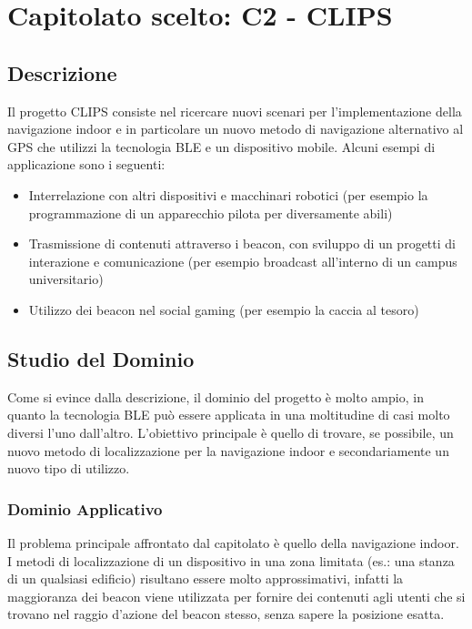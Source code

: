 \section{Capitolato scelto: C2 - CLIPS}

\subsection{Descrizione}

Il progetto CLIPS consiste nel ricercare nuovi scenari per l'implementazione della navigazione indoor e in particolare 
un nuovo metodo di navigazione alternativo al GPS che utilizzi la tecnologia BLE e un dispositivo mobile.
Alcuni esempi di applicazione sono i seguenti:
\begin{itemize}
	\item Interrelazione con altri dispositivi e macchinari robotici (per esempio la programmazione di un apparecchio pilota per diversamente abili)
	\item Trasmissione di contenuti attraverso i beacon, con sviluppo di un progetti di interazione e comunicazione (per esempio broadcast all'interno di un campus universitario)
	\item Utilizzo dei beacon nel social gaming (per esempio la caccia al tesoro)
\end{itemize}

\subsection{Studio del Dominio}

Come si evince dalla descrizione, il dominio del progetto è molto ampio, in quanto la tecnologia BLE può essere applicata in una moltitudine
di casi molto diversi l'uno dall'altro. L'obiettivo principale è quello di trovare, se possibile, un nuovo metodo di localizzazione per la navigazione indoor e secondariamente
un nuovo tipo di utilizzo.


\subsubsection{Dominio Applicativo}
Il problema principale affrontato dal capitolato è quello della navigazione indoor. I metodi di localizzazione di un dispositivo in una zona limitata (es.: una stanza di un qualsiasi edificio)
risultano essere molto approssimativi, infatti la maggioranza dei beacon viene utilizzata per fornire dei contenuti agli utenti che si trovano nel raggio d'azione del beacon stesso, senza sapere 
la posizione esatta.

